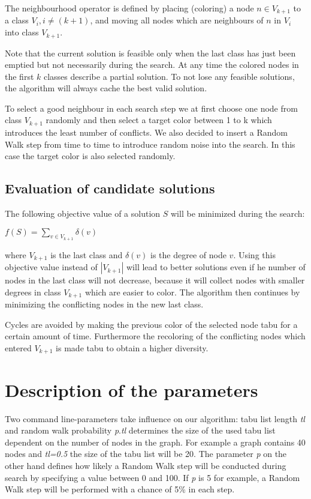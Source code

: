 \documentclass[a4paper]{scrartcl}
\begin{document}
The neighbourhood operator is defined by placing (coloring) a node $n \in V_{k+1}$ to a class $V_i, i \neq (k+1)$, and moving all nodes which are neighbours of $n$ in $V_i$ into class $V_{k+1}$.

Note that the current solution is feasible only when the last class has just been emptied but not necessarily during the search. At any time the colored nodes in the first $k$ classes describe a partial solution. To not lose any feasible solutions, the algorithm will always cache the best valid solution.

To select a good neighbour in each search step we at first choose one node from class $V_{k+1}$ randomly and then select a target color between 1 to k which introduces the least number of conflicts.
We also decided to insert a Random Walk step from time to time to introduce random noise into the search. In this case the target color is also selected randomly.

\subsection{Evaluation of candidate solutions}

The following objective value of a solution $S$ will be minimized during the search:
\begin{center}
$f(S) = \sum_{v \in V_{k+1}} \delta(v)$
\end{center}
where $V_{k+1}$ is the last class and $\delta(v)$ is the degree of node $v$.
Using this objective value instead of $|V_{k+1}|$ will lead to better solutions even if he number of nodes in the last class will not decrease, because it will collect nodes with smaller degrees in class $V_{k+1}$ which are easier to color.
The algorithm then continues by minimizing the conflicting nodes in the new last class.

Cycles are avoided by making the previous color of the selected node tabu for a certain amount of time. Furthermore the recoloring of the conflicting nodes which entered $V_{k+1}$ is made tabu to obtain a higher diversity.

\section{Description of the parameters}

Two command line-parameters take influence on our algorithm: tabu list length \emph{tl} and random walk probability \emph{p}.\emph{tl} determines the size of the used tabu list dependent on the number of nodes in the graph. For example a graph contains 40 nodes and \emph{tl=0.5} the size of the tabu list will be 20.
The parameter \emph{p} on the other hand defines how likely a Random Walk step will be conducted during search by specifying a value between 0 and 100. If \emph{p} is 5 for example, a Random Walk step will be performed with a chance of 5\% in each step.
\end{document}

